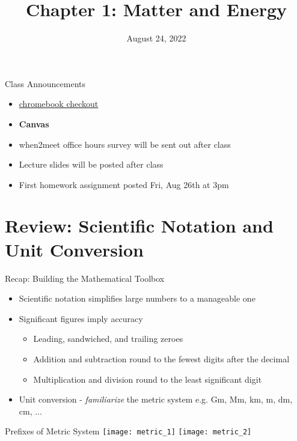 \documentclass[11pt]{beamer}
\title{Chapter 1: Matter and Energy}
\institute{Chemistry Department, Cypress College}
\date{August 24, 2022}
\begin{document}
\begin{frame}
  \titlepage
\end{frame}

\begin{frame}{Class Announcements}
  \begin{itemize}
  \item \href{https://www.cypresscollege.edu/academics/divisions-special-programs/librarylrc/library/}
    {chromebook checkout}
  \item[] \textbf{Canvas}
  \item when2meet office hours survey will be sent out after class
  \item Lecture slides will be posted after class
  \item First homework assignment posted Fri, Aug 26th at 3pm
  \end{itemize}
\end{frame}

\section{Review: Scientific Notation and Unit Conversion}

\begin{frame}{Recap: Building the Mathematical Toolbox}
  \begin{itemize}
  \item Scientific notation simplifies large numbers to
    a manageable one
  \item Significant figures imply accuracy
    \begin{itemize}
    \item Leading, sandwiched, and trailing zeroes
    \item Addition and subtraction round to the fewest digits
      after the decimal
    \item Multiplication and division round to the least significant
      digit
    \end{itemize}
  \item Unit conversion - \textit{familiarize} the metric system
    e.g. Gm, Mm, km, m, dm, cm, ...
  \end{itemize}
\end{frame}

\begin{frame}{Prefixes of Metric System}
  \centering
  \texttt{[image: metric\_1]}
  \texttt{[image: metric\_2]}
\end{frame}
\end{document}
